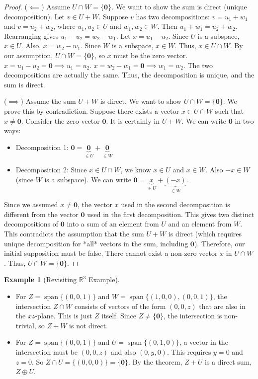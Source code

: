 \documentclass[11pt]{article}
\theoremstyle{plain}
\theoremstyle{definition}
\newtheorem{example}[theorem]{Example}
\theoremstyle{remark}
\DeclareMathOperator{\spanv}{span}
\newcommand{\R}{\mathbb{R}}
\newcommand{\veczero}{\mathbf{0}} %
\begin{document}
\begin{proof}
($\impliedby$) Assume $U \cap W = \{\veczero\}$. We want to show the sum is direct (unique decomposition).
Let $v \in U+W$. Suppose $v$ has two decompositions:
$v = u_1 + w_1$ and $v = u_2 + w_2$, where $u_1, u_2 \in U$ and $w_1, w_2 \in W$.
Then $u_1 + w_1 = u_2 + w_2$. Rearranging gives $u_1 - u_2 = w_2 - w_1$.
Let $x = u_1 - u_2$. Since $U$ is a subspace, $x \in U$.
Also, $x = w_2 - w_1$. Since $W$ is a subspace, $x \in W$.
Thus, $x \in U \cap W$. By our assumption, $U \cap W = \{\veczero\}$, so $x$ must be the zero vector.
$x = u_1 - u_2 = \veczero \implies u_1 = u_2$.
$x = w_2 - w_1 = \veczero \implies w_1 = w_2$.
The two decompositions are actually the same. Thus, the decomposition is unique, and the sum is direct.

($\implies$) Assume the sum $U+W$ is direct. We want to show $U \cap W = \{\veczero\}$. We prove this by contradiction.
Suppose there exists a vector $x \in U \cap W$ such that $x \neq \veczero$.
Consider the zero vector $\veczero$. It is certainly in $U+W$.
We can write $\veczero$ in two ways:
\begin{itemize}
    \item Decomposition 1: $\veczero = \underbrace{\veczero}_{\in U} + \underbrace{\veczero}_{\in W}$
    \item Decomposition 2: Since $x \in U \cap W$, we know $x \in U$ and $x \in W$. Also $-x \in W$ (since $W$ is a subspace). We can write $\veczero = \underbrace{x}_{\in U} + \underbrace{(-x)}_{\in W}$.
\end{itemize}
Since we assumed $x \neq \veczero$, the vector $x$ used in the second decomposition is different from the vector $\veczero$ used in the first decomposition. This gives two distinct decompositions of $\veczero$ into a sum of an element from $U$ and an element from $W$.
This contradicts the assumption that the sum $U+W$ is direct (which requires unique decomposition for *all* vectors in the sum, including $\veczero$).
Therefore, our initial supposition must be false. There cannot exist a non-zero vector $x$ in $U \cap W$.
Thus, $U \cap W = \{\veczero\}$.
\end{proof}

\begin{example}[Revisiting $\R^3$ Example]
\begin{itemize}
    \item For $Z = \spanv\{(0, 0, 1)\}$ and $W = \spanv\{(1, 0, 0), (0, 0, 1)\}$, the intersection $Z \cap W$ consists of vectors of the form $(0, 0, z)$ that are also in the $xz$-plane. This is just $Z$ itself. Since $Z \neq \{\veczero\}$, the intersection is non-trivial, so $Z+W$ is not direct.
    \item For $Z = \spanv\{(0, 0, 1)\}$ and $U = \spanv\{(0, 1, 0)\}$, a vector in the intersection must be $(0, 0, z)$ and also $(0, y, 0)$. This requires $y=0$ and $z=0$. So $Z \cap U = \{(0, 0, 0)\} = \{\veczero\}$. By the theorem, $Z+U$ is a direct sum, $Z \oplus U$.
\end{itemize}
\end{example}
\end{document}
